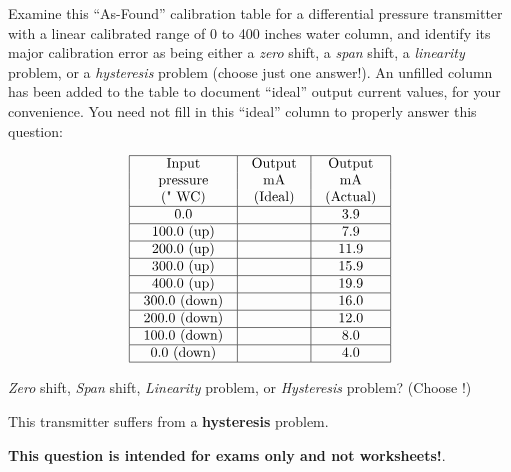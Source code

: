 

Examine this ``As-Found'' calibration table for a differential pressure transmitter with a linear calibrated range of 0 to 400 inches water column, and identify its major calibration error as being either a {\it zero} shift, a {\it span} shift, a {\it linearity} problem, or a {\it hysteresis} problem (choose just one answer!).  An unfilled column has been added to the table to document ``ideal'' output current values, for your convenience.  You need not fill in this ``ideal'' column to properly answer this question:


$$\vbox{\offinterlineskip
\halign{\strut
\vrule \quad\hfil # \ \hfil & 
\vrule \quad\hfil # \ \hfil & 
\vrule \quad\hfil # \ \hfil \vrule \cr
\noalign{\hrule}
%
Input & Output & Output \cr
%
pressure & mA & mA \cr
%
(" WC) & (Ideal) & (Actual) \cr
%
\noalign{\hrule}
%
0.0 & & 3.9 \cr
%
\noalign{\hrule}
%
100.0 (up) & & 7.9 \cr
%
\noalign{\hrule}
%
200.0 (up) & & 11.9 \cr
%
\noalign{\hrule}
%
300.0 (up) & & 15.9 \cr
%
\noalign{\hrule}
%
400.0 (up) & & 19.9 \cr
%
\noalign{\hrule}
%
300.0 (down) & & 16.0 \cr
%
\noalign{\hrule}
%
200.0 (down) & & 12.0 \cr
%
\noalign{\hrule}
%
100.0 (down) & & 8.0 \cr
%
\noalign{\hrule}
%
0.0 (down) & & 4.0 \cr
%
\noalign{\hrule}
} %
}$$ %

{\it Zero} shift, {\it Span} shift, {\it Linearity} problem, or {\it Hysteresis} problem?  (Choose !)







This transmitter suffers from a {\bf hysteresis} problem.







{\bf This question is intended for exams only and not worksheets!}.


